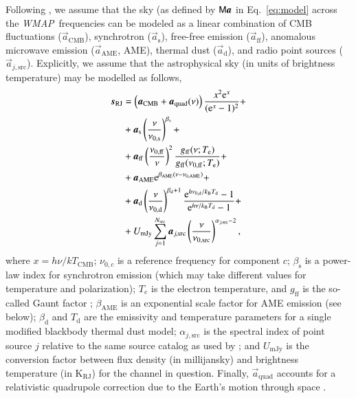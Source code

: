 \documentclass[twocolumn]{../../common/aa}
\def\WMAP{\emph{WMAP}}
\renewcommand{\a}[0]{\vec{a}}
\newcommand{\M}[0]{\tens{M}}
\newcommand{\Te}[0]{T_{\rm e}}
\newcommand{\e}{\mathrm e}
\def\Tdust{\ifmmode T_\mathrm{d}\else $T_{\mathrm{d}}$\fi}
\def\bdust{\ifmmode \beta_\mathrm{d}\else $\beta_{\mathrm{d}}$\fi}
\def\bsynch{\ifmmode \beta_\mathrm{s}\else $\beta_{\mathrm{s}}$\fi}
\def\nuzeros{\ifmmode \nu_{0,\mathrm{s}}\else $\nu_{0,\mathrm{s}}$\fi}
\def\nuzeroff{\ifmmode \nu_{0,\mathrm{ff}}\else $\nu_{0,\mathrm{ff}}$\fi}
\def\nuzerod{\ifmmode \nu_{0,\mathrm{d}}\else $\nu_{0,\mathrm{d}}$\fi}
\def\nuzeroame{\ifmmode \nu_{0,\mathrm{AME}}\else $\nu_{0,\mathrm{AME}}$\fi}
\def\nuzerosrc{\ifmmode \nu_{0,\mathrm{src}}\else $\nu_{0,\mathrm{src}}$\fi}
\def\nup{\ifmmode \nu_{\mathrm{p}}\else $\nu_{\mathrm{p}}$\fi}
\def\Te{\ifmmode T_{\mathrm{e}}\else $T_{\mathrm{e}}$\fi}
\def\kB{\ifmmode k_\mathrm{B}\else $k_{\mathrm{B}}$\fi}
\begin{document}
Following \citet{bp01}, we assume that the sky (as defined by $\M\boldsymbol a$ in Eq.~\eqref{eq:model} across the \WMAP\ frequencies can be modeled as a linear combination of CMB fluctuations ($\vec{a}_{\mathrm{CMB}}$), synchrotron ($\vec{a}_{\mathrm{s}}$), free-free emission ($\vec{a}_{\mathrm{ff}}$), anomalous microwave emission ($\vec{a}_{\mathrm{AME}}$, AME), thermal dust ($\vec{a}_{\mathrm{d}}$), and radio point sources ($\vec{a}_{j,\mathrm{src}}$). Explicitly, we assume that the astrophysical sky (in units of brightness temperature) may be modelled as follows,
\begin{align}
  \vec{s}_{\mathrm{RJ}} &= \left(\vec{a}_{\mathrm{CMB}}+\vec{a}_{\mathrm{quad}}(\nu)\right) \frac{x^2 \e^x}{(\e^x -1)^2}+\label{eq:cmb_astsky}\\
  &+ \vec{a}_{\mathrm{s}} \left(\frac{\nu}{\nuzeros}\right)^{\bsynch} + \label{eq:synch_astsky}\\
  &+ \vec{a}_{\mathrm{ff}} \left(\frac{\nuzeroff}{\nu}\right)^2 \frac{g_{\mathrm{ff}}(\nu;\Te) }{g_{\mathrm{ff}}(\nuzeroff;\Te)} +\label{eq:ff_astsky}\\
  &+ \vec{a}_{\mathrm{AME}} \e^{\beta_{\mathrm{AME}}(\nu-\nu_{0,\mathrm{AME}})}+\label{eq:ame_astsky}  \\
  &+ \vec{a}_{\mathrm{d}} \left(\frac{\nu}{\nuzerod}\right)^{\bdust+1} \frac{\e^{h\nuzerod/\kB\Tdust}-1}{\e^{h\nu/\kB\Tdust}-1}+ \label{eq:dust_astsky}\\
  &+ U_{\mathrm{mJy}} \sum_{j=1}^{N_{\mathrm{src}}} \vec{a}_{j,\mathrm{src}} \left(\frac{\nu}{\nuzerosrc}\right)^{\alpha_{j,\mathrm{src}}-2}, \label{eq:sum_ptsrc}
\end{align}
where $x=h\nu/kT_{\mathrm{CMB}}$; $\nu_{0,c}$ is a reference frequency for component $c$; $\beta_{\mathrm{s}}$ is a power-law index for synchrotron emission (which may take different values for temperature and polarization); $T_e$ is the electron temperature, and $g_{\mathrm{ff}}$ is the so-called Gaunt factor \citep{dickinson2003}; $\beta_{\mathrm{AME}}$ is an exponential scale factor for AME emission (see below); $\beta_{\mathrm{d}}$ and $T_{\mathrm{d}}$ are the emissivity and temperature parameters for a single modified blackbody thermal dust model; $\alpha_{j,\mathrm{src}}$ is the spectral index of point source $j$ relative to the same source catalog as used by \citet{planck2016-l04}; and $U_{\mathrm{mJy}}$ is the conversion factor between flux density (in millijansky) and brightness temperature (in $\mathrm{K_{RJ}}$) for the channel in question. Finally, $\a_{\mathrm{quad}}$ accounts for a relativistic quadrupole correction due to the Earth's motion through space \citep{Notari:2015}.
\end{document}
